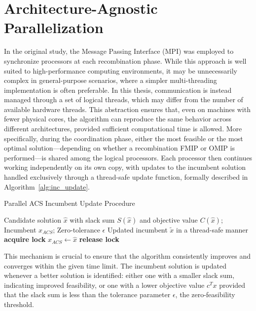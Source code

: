 \section{Architecture-Agnostic Parallelization}
In the original study, the Message Passing Interface (MPI) was employed to synchronize processors at each recombination phase. While this approach is well suited to high-performance computing environments, it may be unnecessarily complex in general-purpose scenarios, where a simpler multi-threading implementation is often preferable.  
In this thesis, communication is instead managed through a set of logical threads, which may differ from the number of available hardware threads. This abstraction ensures that, even on machines with fewer physical cores, the algorithm can reproduce the same behavior across different architectures, provided sufficient computational time is allowed.  
More specifically, during the coordination phase, either the most feasible or the most optimal solution—depending on whether a recombination FMIP or OMIP is performed—is shared among the logical processors. Each processor then continues working independently on its own copy, with updates to the incumbent solution handled exclusively through a thread-safe update function, formally described in Algorithm~\ref{alg:inc_update}.  
\begin{algorithm}[H]
\caption{Parallel ACS Incumbent Update Procedure}\label{alg:inc_update}
\begin{algorithmic}[1]
\Require Candidate solution $\hat{x}$ with slack sum $S(\hat{x})$ and objective value $C(\hat{x})$; Incumbent $x_{ACS}$; Zero-tolerance $\epsilon$
\Ensure Updated incumbent $\tilde{x}$ in a thread-safe manner
    \State \textbf{acquire lock}
        \State $x_{ACS} \gets \hat{x}$
    \EndIf
    \State \textbf{release lock}
\EndFunction
\end{algorithmic}
\end{algorithm}

This mechanism is crucial to ensure that the algorithm consistently improves and converges within the given time limit. The incumbent solution is updated whenever a better solution is identified: either one with a smaller slack sum, indicating improved feasibility, or one with a lower objective value $c^T x$ provided that the slack sum is less than the tolerance parameter $\epsilon$, the zero-feasibility threshold.

